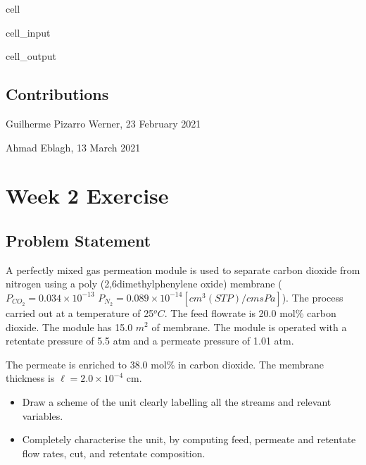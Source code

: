 \documentclass[letterpaper,10pt,english]{jupyterBook}
\begin{document}
\begin{sphinxuseclass}{cell}
\begin{sphinxVerbatimInput}
\begin{sphinxuseclass}{cell_input}
\end{sphinxuseclass}\end{sphinxVerbatimInput}
\begin{sphinxVerbatimOutput}

\begin{sphinxuseclass}{cell_output}
\noindent{}

\end{sphinxuseclass}\end{sphinxVerbatimOutput}

\end{sphinxuseclass}

\subsection{Contributions}
\label{\detokenize{MSMPR_crystallizer:contributions}}
\sphinxAtStartPar
Guilherme Pizarro Werner, 23 February 2021

\sphinxAtStartPar
Ahmad Eblagh, 13 March 2021

\sphinxstepscope


\section{Week 2 \sphinxhyphen{} Exercise}
\label{\detokenize{Exercise_W2_2025:week-2-exercise}}\label{\detokenize{Exercise_W2_2025::doc}}

\subsection{Problem Statement}
\label{\detokenize{Exercise_W2_2025:problem-statement}}
\sphinxAtStartPar
A perfectly mixed gas permeation module is used to separate carbon dioxide from nitrogen using a poly
(2,6\sphinxhyphen{}dimethylphenylene oxide) membrane	(\(P_{CO_2}=0.034\times10^{-13}\) \(P_{N_2}=0.089\times10^{-14} [cm^3 (STP) / cm s Pa]\)). The process carried out at a temperature of 25\(^oC\).
The feed flowrate is 20.0 mol\% carbon dioxide.
The module has 15.0 \(m^2\) of membrane. The module is operated with a retentate pressure of 5.5 atm
and a permeate pressure of 1.01 atm.

\sphinxAtStartPar
The permeate is enriched to 38.0 mol\% in carbon dioxide. The membrane thickness is \(\ell = 2.0 \times 10^{-4}\) cm.
\begin{itemize}
\item {} 
\sphinxAtStartPar
Draw a scheme of the unit clearly labelling all the streams and relevant variables.

\item {} 
\sphinxAtStartPar
Completely characterise the unit, by computing feed, permeate and retentate flow rates, cut, and retentate composition.

\end{itemize}
\end{document}
